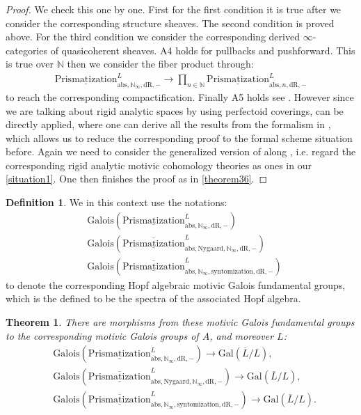 \documentclass[12pt]{article}
\newtheorem{theorem}{Theorem}
\theoremstyle{definition}
\newtheorem{definition}{Definition}
\begin{document}
\begin{proof}
We check this one by one. First for the first condition it is true after we consider the corresponding structure sheaves. The second condition is proved above. For the third condition we consider the corresponding derived $\infty$-categories of quasicoherent sheaves. A4 holds for pullbacks and pushforward. This is true over $\mathbb{N}$ then we consider the fiber product through:
\begin{align}
{\underline{\mathrm{Prismatization}}}^L_{\mathrm{abs},\mathbb{N}_\infty,\mathrm{dR},-}\rightarrow  \prod_{n\in \mathbb{N}} {\underline{\mathrm{Prismatization}}}^L_{\mathrm{abs},n,\mathrm{dR},-}
\end{align}
to reach the corresponding compactification. Finally A5 holds see \cite[Chapter 4, in particular 4.7, 4.8, 4.9, 4.10]{3A}. However since we are talking about rigid analytic spaces by using perfectoid coverings, \cite{3A} can be directly applied, where one can derive all the results from the formalism in \cite{3A}, which allows us to reduce the corresponding proof to the formal scheme situation before. Again we need to consider the generalized version of \cite{3A} along \cite{3S}, i.e. regard the corresponding rigid analytic motivic cohomology theories as ones in our \cref{situation1}. One then finishes the proof as in \cref{theorem36}.
\end{proof}


\begin{definition}
We in this context use the notations:
\begin{align}
&\mathrm{Galois}(\underline{\mathrm{Prismatization}}^L_{\mathrm{abs},\mathbb{N}_\infty,\mathrm{dR},-})\\
&\mathrm{Galois}(\overline{\underline{\mathrm{Prismatization}}}^L_{\mathrm{abs},\mathrm{Nygaard},\mathbb{N}_\infty,\mathrm{dR},-})\\
&\mathrm{Galois}(\overline{\underline{\mathrm{Prismatization}}}^L_{\mathrm{abs},\mathbb{N}_\infty,\mathrm{syntomization},\mathrm{dR},-})
\end{align}
to denote the corresponding Hopf algebraic motivic Galois fundamental groups, which is the defined to be the spectra of the associated Hopf algebra.
\end{definition}


\begin{theorem}
There are morphisms from these motivic Galois fundamental groups to the corresponding motivic Galois groups of $A$, and moreover $L$: 
\begin{align}
&\mathrm{Galois}(\underline{\mathrm{Prismatization}}^L_{\mathrm{abs},\mathbb{N}_\infty,\mathrm{dR},-})\rightarrow \mathrm{Gal}(\overline{L}/L),\\
&\mathrm{Galois}(\overline{\underline{\mathrm{Prismatization}}}^L_{\mathrm{abs},\mathrm{Nygaard},\mathbb{N}_\infty,\mathrm{dR},-})\rightarrow \mathrm{Gal}(\overline{L}/L),\\
&\mathrm{Galois}(\overline{\underline{\mathrm{Prismatization}}}^L_{\mathrm{abs},\mathbb{N}_\infty,\mathrm{syntomization},\mathrm{dR},-})\rightarrow \mathrm{Gal}(\overline{L}/L).
\end{align}
\end{theorem}
\end{document}
